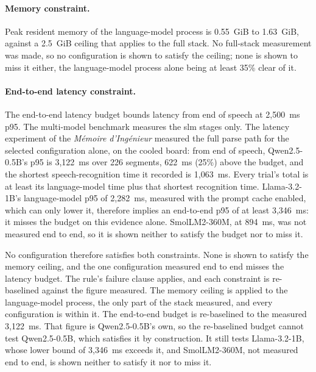 \paragraph{Memory constraint.} Peak resident memory of the language-model process is 0.55~GiB to
1.63~GiB, against a 2.5~GiB ceiling that applies to the full stack. No full-stack measurement was
made, so no configuration is shown to satisfy the ceiling; none is shown to miss it either, the
language-model process alone being at least 35\% clear of it.

\paragraph{End-to-end latency constraint.} The end-to-end latency budget bounds latency from end
of speech at 2{,}500~ms p95. The multi-model benchmark measures the \gls{slm} stages only. The
latency experiment of the \emph{M\'emoire d'Ing\'enieur} measured the full parse path for the
selected configuration alone, on the cooled board: from end of speech, Qwen2.5-0.5B's p95 is
3{,}122~ms over 226 segments, 622~ms (25\%) above the budget, and the shortest speech-recognition
time it recorded is 1{,}063~ms.
Every trial's total is at least its language-model time plus that shortest recognition time.
Llama-3.2-1B's language-model p95 of 2{,}282~ms, measured with the prompt cache enabled, which can
only lower it, therefore implies an end-to-end p95 of at least 3{,}346~ms: it misses the budget on
this evidence alone. SmolLM2-360M, at 894~ms, was not measured end to end, so it is shown neither to
satisfy the budget nor to miss it.

No configuration therefore satisfies both constraints. None is shown to satisfy the memory ceiling,
and the one configuration measured end to end misses the latency budget. The rule's failure clause
applies, and each constraint is re-baselined against the figure measured. The memory ceiling is
applied to the language-model process, the only part of the stack measured, and every
configuration is within it. The end-to-end budget is re-baselined to the measured 3{,}122~ms.
That figure is Qwen2.5-0.5B's own, so the re-baselined budget cannot test Qwen2.5-0.5B, which
satisfies it by construction. It still tests Llama-3.2-1B, whose lower bound of 3{,}346~ms exceeds
it, and SmolLM2-360M, not measured end to end, is shown neither to satisfy it nor to miss it.

